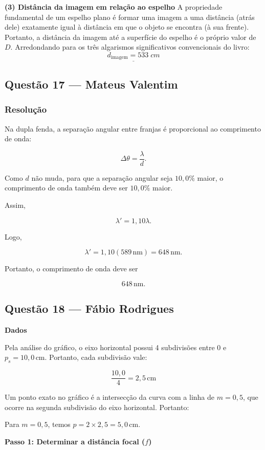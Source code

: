 \documentclass[12pt,a4paper]{article}
\begin{document}
\vspace{0.2cm}
\textbf{(3) Distância da imagem em relação ao espelho}
A propriedade fundamental de um espelho plano é formar uma imagem a uma distância (atrás dele) exatamente igual à distância em que o objeto se encontra (à sua frente). Portanto, a distância da imagem até a superfície do espelho é o próprio valor de \(D\). 
Arredondando para os três algarismos significativos convencionais do livro:
\[\underline{d_{\text{imagem}} = 533\;cm}\]

\subsection{Questão 17 — Mateus Valentim}
\subsubsection{Resolução}

Na dupla fenda, a separação angular entre franjas é proporcional ao comprimento
de onda:

\[
\Delta\theta=\frac{\lambda}{d}.
\]

Como \(d\) não muda, para que a separação angular seja \(10{,}0\%\) maior, o
comprimento de onda também deve ser \(10{,}0\%\) maior.

Assim,

\[
\lambda'=1{,}10\lambda.
\]

Logo,

\[
\lambda'=1{,}10(589\,\text{nm})
=648\,\text{nm}.
\]

Portanto, o comprimento de onda deve ser

\[
\boxed{648\,\text{nm}}.
\]

\subsection{Questão 18 — Fábio Rodrigues}
\textbf{Dados}

Pela análise do gráfico, o eixo horizontal possui 4 subdivisões entre \(0\) e \(p_s = 10,0\,\text{cm}\). Portanto, cada subdivisão vale:

\[
\frac{10,0}{4} = 2,5\,\text{cm}
\]

Um ponto exato no gráfico é a intersecção da curva com a linha de \(m = 0,5\), que ocorre na segunda subdivisão do eixo horizontal. Portanto:

Para \(m = 0,5\), temos \(p = 2 \times 2,5 = 5,0\,\text{cm}\).

\textbf{Passo 1: Determinar a distância focal (\(f\))}
\end{document}
